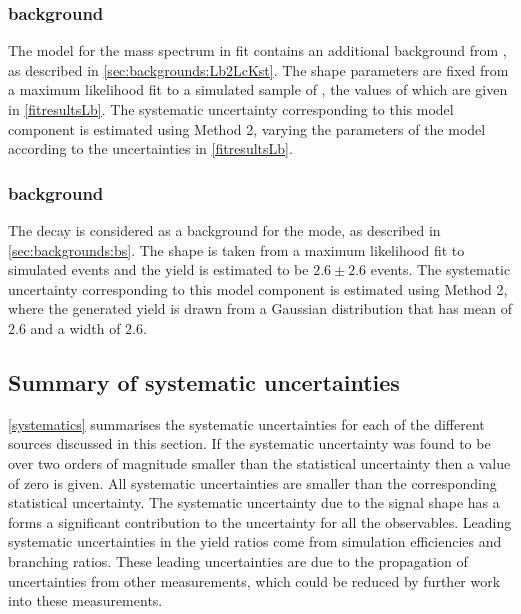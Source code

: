 \subsubsection{\boldmath {} background}

The model for the \kk mass spectrum in \CP fit contains an additional background from , as described in \sect\ref{sec:backgrounds:Lb2LcKst}. The shape parameters are fixed from a maximum likelihood fit to a simulated sample of , the values of which are given in \tab\ref{fitresultsLb}. The systematic uncertainty corresponding to this model component is estimated using Method 2, varying the parameters of the model according to the uncertainties in \tab\ref{fitresultsLb}.

\subsubsection{\boldmath {} background}

The decay  is considered as a background for the \pik mode, as described in \sect\ref{sec:backgrounds:bs}. The shape is taken from a maximum likelihood fit to simulated events and the yield is estimated to be $2.6 \pm 2.6$ events. The systematic uncertainty corresponding to this model component is estimated using Method 2, where the generated yield is drawn from a Gaussian distribution that has mean of $2.6$ and a width of $2.6$.

\subsection{Summary of systematic uncertainties}

\Tab\ref{systematics} summarises the systematic uncertainties for each of the different sources discussed in this section. If the systematic uncertainty was found to be over two orders of magnitude smaller than the statistical uncertainty then a value of zero is given. All systematic uncertainties are smaller than the corresponding statistical uncertainty. The systematic uncertainty due to the signal shape has a forms a significant contribution to the uncertainty for all the \CP observables. Leading systematic uncertainties in the yield ratios come from simulation efficiencies and branching ratios. These leading uncertainties are due to the propagation of uncertainties from other measurements, which could be reduced by further work into these measurements.

